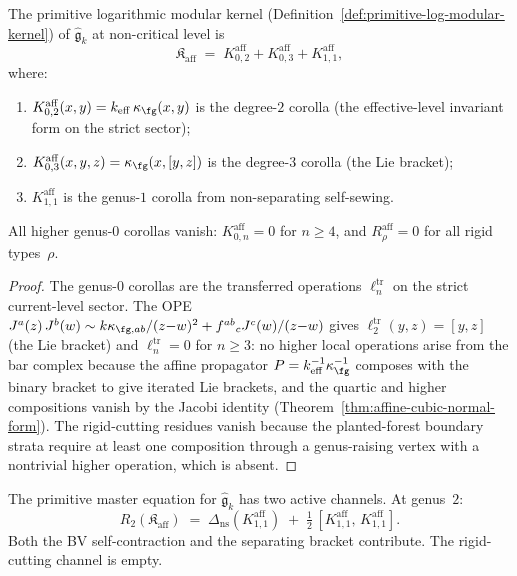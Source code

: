 \begin{proposition}
\label{prop:affine-primitive-kernel}
The primitive logarithmic modular kernel
\textup{(}Definition~\textup{\ref{def:primitive-log-modular-kernel})}
of $\widehat{\mathfrak{g}}_k$ at non-critical level is
\begin{equation}\label{eq:affine-primitive-kernel}
\mathfrak{K}_{\mathrm{aff}}
\;=\;
K_{0,2}^{\mathrm{aff}} + K_{0,3}^{\mathrm{aff}} + K_{1,1}^{\mathrm{aff}},
\end{equation}
where:
\begin{enumerate}[label=\textup{(\roman*)}]
\item $K_{0,2}^{\mathrm{aff}}(x,y) = k_{\mathrm{eff}}\,\kappa_{\fg}(x,y)$
 is the degree-$2$ corolla \textup{(}the effective-level invariant form
 on the strict sector\textup{)};
\item $K_{0,3}^{\mathrm{aff}}(x,y,z) = \kappa_{\fg}(x,[y,z])$
 is the degree-$3$ corolla \textup{(}the Lie bracket\textup{)};
\item $K_{1,1}^{\mathrm{aff}}$ is the genus-$1$ corolla from
 non-separating self-sewing.
\end{enumerate}
All higher genus-$0$ corollas vanish:
$K_{0,n}^{\mathrm{aff}} = 0$ for $n \geq 4$, and
$R_\rho^{\mathrm{aff}} = 0$ for all rigid types~$\rho$.
\end{proposition}

\begin{proof}
The genus-$0$ corollas are the transferred operations
$\ell_n^{\mathrm{tr}}$ on the strict current-level sector. The OPE
$J^a(z)\,J^b(w) \sim
k\kappa_{\fg,ab}/(z{-}w)^2 + f^{ab}{}_c J^c(w)/(z{-}w)$
gives $\ell_2^{\mathrm{tr}}(y,z) = [y,z]$ (the Lie bracket) and
$\ell_n^{\mathrm{tr}} = 0$ for $n \geq 3$: no higher local
operations arise from the bar complex because the affine
propagator $P = k_{\mathrm{eff}}^{-1}\kappa_{\fg}^{-1}$ composes with the
binary bracket to give iterated Lie brackets, and the quartic and
higher compositions vanish by the Jacobi identity
(Theorem~\ref{thm:affine-cubic-normal-form}). The rigid-cutting
residues vanish because the planted-forest boundary strata require
at least one composition through a genus-raising vertex with a
nontrivial higher operation, which is absent.
\end{proof}

\begin{proposition}
\label{prop:affine-primitive-shell}
The primitive master equation for $\widehat{\mathfrak{g}}_k$
has two active channels. At genus~$2$:
\begin{equation}\label{eq:affine-shell-genus2}
R_2(\mathfrak{K}_{\mathrm{aff}})
\;=\;
\Delta_{\mathrm{ns}}(K_{1,1}^{\mathrm{aff}})
\;+\;
\tfrac{1}{2}\,[K_{1,1}^{\mathrm{aff}},\,
K_{1,1}^{\mathrm{aff}}].
\end{equation}
Both the BV self-contraction and the separating bracket contribute.
The rigid-cutting channel is empty.
\end{proposition}

